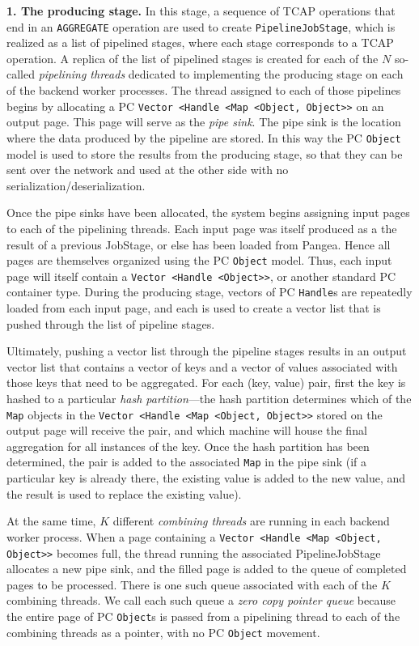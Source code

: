 \vspace{5pt}
{\bf 1. The producing stage.} In this stage, a sequence of TCAP
operations that end in an \texttt{AGGREGATE} operation are used to
create \texttt{PipelineJobStage}, which is 
realized as a list
of pipelined stages, where each stage corresponds to a TCAP operation.
A replica of the list of pipelined stages is
created for each of the $N$ so-called \emph{pipelining threads} dedicated to implementing
the producing stage on each of the backend worker processes.  
The thread assigned to each of those pipelines begins by allocating a PC \texttt{Vector <Handle <Map <Object, Object>>} on an output page.  This page will serve
as the \emph{pipe sink}.  The pipe sink is
the location where the data produced by the pipeline are stored.  In this way the PC \texttt{Object} model is used to store the results
from the producing stage, so that they can be sent over the network and used at the other side with no serialization/deserialization.

Once the pipe sinks have been allocated,
the system begins assigning input pages to each of the pipelining 
threads.  Each input page was itself produced as a the result of a previous JobStage, or else has been
loaded from Pangea.  Hence all pages are themselves organized using the PC \texttt{Object} model.  Thus, each input
page will itself contain a \texttt{Vector <Handle <Object>>},
or another standard PC container type.  During the producing stage, vectors of PC \texttt{Handle}s are repeatedly
loaded from each input page, and each is used to create a vector list that is pushed through the list of pipeline stages.

Ultimately, pushing a vector list through the pipeline stages results in an output vector list that contains a vector of keys and a vector of values 
associated with those keys that need to be aggregated.  
For each (key, value)
pair, first the key is hashed to a particular \emph{hash partition}---the hash partition determines which of the \texttt{Map}
objects in the \texttt{Vector <Handle <Map <Object, Object>>} stored on the output page will receive the pair, and which machine will house the final aggregation
for all instances of the key.  Once the hash partition has been determined,
the pair is added to the associated \texttt{Map} in the pipe sink
(if a particular key is already there, the
existing value is added to the new value, and the result is used to replace the existing value).  

At the same time, 
$K$ different \emph{combining threads} are running in each backend worker process.  
When a page containing a \texttt{Vector <Handle <Map <Object, Object>>} becomes full, the thread running the associated PipelineJobStage allocates a new
pipe sink,
and the filled page is added to the queue of completed pages to be processed.  There is one such queue
associated with each of the $K$ combining threads.
We call each such queue a \emph{zero copy pointer queue} because the entire page of PC \texttt{Object}s is passed from a pipelining thread to each of the
combining threads as a pointer, with no PC \texttt{Object} movement.

